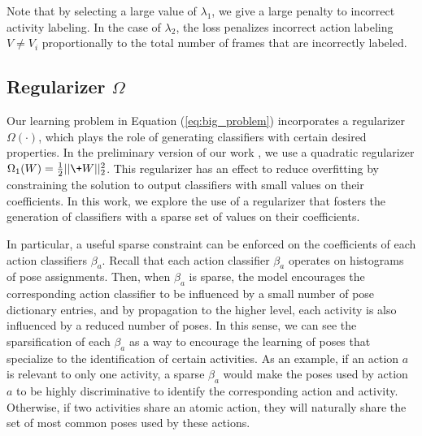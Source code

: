 
Note that by selecting a large value of $\lambda_1$, we give a large penalty to
incorrect activity labeling. In the case of $\lambda_2$, the loss penalizes
incorrect action labeling $V \neq V_i$ proportionally to the
total number of frames that are incorrectly labeled.

\subsection{Regularizer $\Omega$} \label{subsec:regularizer}
Our learning problem in Equation (\ref{eq:big_problem}) incorporates
a regularizer $\Omega(\cdot)$, which plays the role of generating classifiers with certain desired 
properties. In the preliminary version of our work \cite{Lillo2014}, we use a quadratic regularizer 
$\Omega_1( W) = \frac{1}{2}||\+W||_2^2$. This regularizer has an effect to reduce overfitting by 
constraining the solution to output classifiers with small values on their coefficients. In this 
work, we explore the use of a regularizer that fosters the generation of classifiers with a 
sparse set of values on their coefficients.

In particular, a useful sparse constraint can be enforced on the coefficients of each action 
classifiers $\beta_a$. Recall that each action classifier $\beta_a$ operates on histograms of pose assignments.
Then, when $\beta_a$ is sparse, the model encourages the corresponding action classifier to be 
influenced by a
small number of pose dictionary entries, and by propagation to the higher level,
each activity is also influenced by a reduced number of poses. In this sense, we can see the 
sparsification of each $\beta_a$ as a way to encourage the learning of poses that specialize to 
the identification of certain activities. As an example, if an action $a$ is relevant to only one 
activity,
a sparse $\beta_a$ would make the poses used by action $a$ to be highly discriminative to identify 
the 
corresponding action and activity. Otherwise, if two activities share an atomic action,
they will naturally share the set of most common poses used by these actions.

